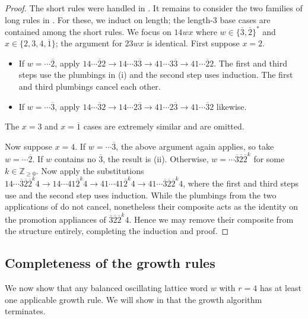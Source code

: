 \documentclass{amsart}
\theoremstyle{definition}
\theoremstyle{remark}
\numberwithin{equation}{section}
\begin{document}
\begin{proof}
 The short rules were handled in . It remains to consider the two families of long rules in . For these, we induct on length; the length-$3$ base cases are contained among the short rules. We focus on $14wx$ where $w \in  \{\overline{3}, \overline{2}\}^*$ and $x \in \{2, 3, 4, \overline{1}\}$; the argument for $23wx$ is identical. First suppose $x=2$.
  \begin{itemize}
    \item If $w=\cdots\overline{2}$, apply $14\cdots\overline{2}2 \to 14\cdots3\overline{3} \to 41\cdots3\overline{3} \to 41\cdots\overline{2}2$. The first and third steps use the plumbings in (i) and the second step uses induction. The first and third plumbings cancel each other.
    \item If $w=\cdots\overline{3}$, apply $14\cdots\overline{3}2 \to 14\cdots2\overline{3} \to 41\cdots2\overline{3} \to 41\cdots\overline{3}2$ likewise.
  \end{itemize}
  The $x=3$ and $x=\overline{1}$ cases are extremely similar and are omitted. 
  
  Now suppose $x=4$. If $w=\cdots\overline{3}$, the above argument again applies, so take $w=\cdots\overline{2}$. If $w$ contains no $\overline{3}$, the result is (ii). Otherwise, $w = \cdots\overline{3}\overline{2}\overline{2}^k$ for some $k \in \mathbb{Z}_{\geq 0}$. Now apply the substitutions $14\cdots\overline{3}\overline{2}\overline{2}^k4 \to 14\cdots41\overline{2}^k4 \to 41\cdots41\overline{2}^k4 \to 41\cdots\overline{3}\overline{2}\overline{2}^k4$, where the first and third steps use  and the second step uses induction. While the plumbings from the two applications of  do not cancel, nonetheless their composite acts as the identity on the promotion appliances of $\overline{3}\overline{2}\overline{2}^k4$. Hence we may remove their composite from the structure entirely, completing the induction and proof.
\end{proof}

\subsection{Completeness of the growth rules}\label{sec:completeness}

We now show that any balanced oscillating lattice word $w$ with $r=4$ has at least one applicable growth rule. We will show in  that the growth algorithm terminates.
\end{document}
